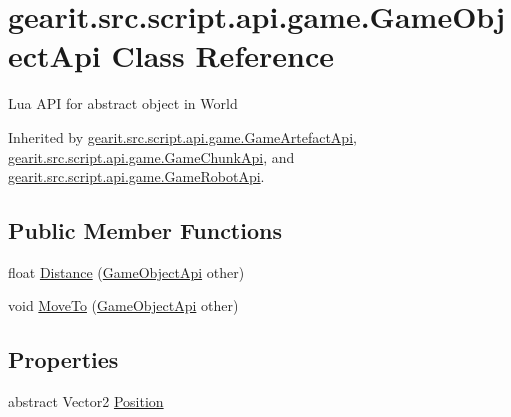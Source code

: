 \hypertarget{classgearit_1_1src_1_1script_1_1api_1_1game_1_1_game_object_api}{\section{gearit.\+src.\+script.\+api.\+game.\+Game\+Object\+Api Class Reference}
\label{classgearit_1_1src_1_1script_1_1api_1_1game_1_1_game_object_api}
}


Lua A\+P\+I for abstract object in World  




Inherited by \hyperlink{classgearit_1_1src_1_1script_1_1api_1_1game_1_1_game_artefact_api}{gearit.\+src.\+script.\+api.\+game.\+Game\+Artefact\+Api}, \hyperlink{classgearit_1_1src_1_1script_1_1api_1_1game_1_1_game_chunk_api}{gearit.\+src.\+script.\+api.\+game.\+Game\+Chunk\+Api}, and \hyperlink{classgearit_1_1src_1_1script_1_1api_1_1game_1_1_game_robot_api}{gearit.\+src.\+script.\+api.\+game.\+Game\+Robot\+Api}.

\subsection*{Public Member Functions}
\begin{DoxyCompactItemize}
\item 
float \hyperlink{classgearit_1_1src_1_1script_1_1api_1_1game_1_1_game_object_api_a6eef98a0d748ff313e388b6dbdcc5a7c}{Distance} (\hyperlink{classgearit_1_1src_1_1script_1_1api_1_1game_1_1_game_object_api}{Game\+Object\+Api} other)
\item 
void \hyperlink{classgearit_1_1src_1_1script_1_1api_1_1game_1_1_game_object_api_ae0249fa037cd47573cc47302c3770444}{Move\+To} (\hyperlink{classgearit_1_1src_1_1script_1_1api_1_1game_1_1_game_object_api}{Game\+Object\+Api} other)
\end{DoxyCompactItemize}
\subsection*{Properties}
\begin{DoxyCompactItemize}
\item 
abstract Vector2 \hyperlink{classgearit_1_1src_1_1script_1_1api_1_1game_1_1_game_object_api_abb4b5c17a9920fc1be3049d6a5142b06}{Position}
\end{DoxyCompactItemize}


